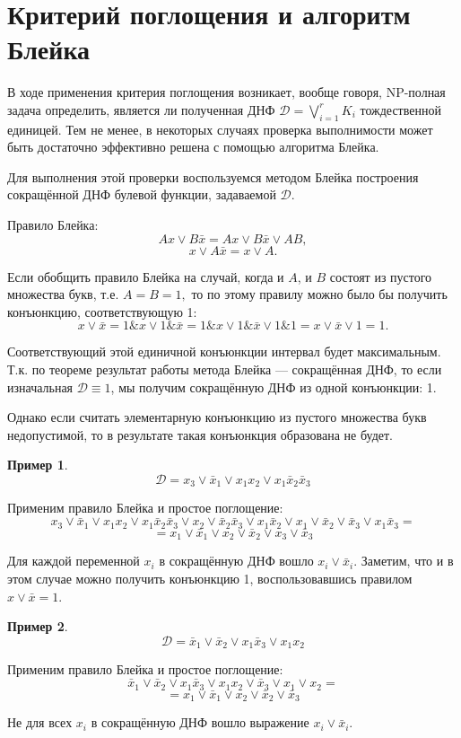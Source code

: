 \documentclass[12pt,a4paper,oneside,fleqn,leqno]{article}
\theoremstyle{definition}
\newtheorem{example}{Пример}%
\begin{document}
	\section{Критерий поглощения и алгоритм Блейка}
		В ходе применения критерия поглощения возникает, вообще говоря, NP-полная задача определить, является ли полученная ДНФ $\mathcal{D} = \bigvee\limits_{i = 1}^rK_i$ тождественной единицей. Тем не менее, в некоторых случаях проверка выполнимости может быть достаточно эффективно решена с помощью алгоритма Блейка.\par
		Для выполнения этой проверки воспользуемся методом Блейка построения сокращённой ДНФ булевой функции, задаваемой $\mathcal{D}.$\par
		Правило Блейка:
		$$
			Ax \vee B\bar{x} = Ax \vee B\bar{x} \vee AB,
		$$
		$$
			x \vee A\bar{x} = x \vee A.
		$$\par
		Если обобщить правило Блейка на случай, когда и $A$, и $B$ состоят из пустого множества букв, т.е. $A = B = 1,$ то по этому правилу можно было бы получить конъюнкцию, соответствующую 1:
		$$
			x \vee \bar{x} = 1\& x \vee 1\&\bar{x} = 1 \& x \vee 1\&\bar{x} \vee 1 \& 1 = x \vee \bar{x} \vee 1 = 1.
		$$\par
		Соответствующий этой единичной конъюнкции интервал будет максимальным. Т.к. по теореме результат работы метода Блейка --- сокращённая ДНФ, то если изначальная $\mathcal{D} \equiv 1$, мы получим сокращённую ДНФ из одной конъюнкции: 1.\par
		Однако если считать элементарную конъюнкцию из пустого множества букв недопустимой, то в результате такая конъюнкция образована не будет.
		\begin{example}
			$$
				\mathcal{D} = x_3 \vee \bar{x}_1 \vee x_1x_2 \vee x_1\bar{x}_2\bar{x}_3
			$$\par
			Применим правило Блейка и простое поглощение:
			$$
				x_3 \vee \bar{x}_1 \vee x_1x_2 \vee x_1\bar{x}_2\bar{x}_3 \vee x_2 \vee \bar{x}_2\bar{x}_3 \vee x_1\bar{x}_2 \vee x_1 \vee \bar{x}_2 \vee \bar{x}_3 \vee x_1\bar{x}_3 =
			$$
			$$
				= x_1 \vee \bar{x}_1 \vee x_2 \vee \bar{x}_2 \vee x_3 \vee \bar{x}_3
			$$\par
			Для каждой переменной $x_i$ в сокращённую ДНФ вошло $x_i \vee \bar{x}_i.$ Заметим, что и в этом случае можно получить конъюнкцию 1, воспользовавшись правилом $x \vee \bar{x} = 1.$
		\end{example}
		\begin{example}
			$$
				\mathcal{D} = \bar{x}_1 \vee \bar{x}_2 \vee x_1\bar{x}_3 \vee x_1x_2
			$$\par
			Применим правило Блейка и простое поглощение:
			$$
				\bar{x}_1 \vee \bar{x}_2 \vee x_1\bar{x}_3 \vee x_1x_2 \vee \bar{x}_3 \vee x_1 \vee x_2 =
			$$
			$$
				= x_1 \vee \bar{x}_1  \vee x_2 \vee \bar{x}_2 \vee \bar{x}_3
			$$\par
			Не для всех $x_i$ в сокращённую ДНФ вошло выражение $x_i \vee \bar{x}_i.$
		\end{example}
\end{document}
